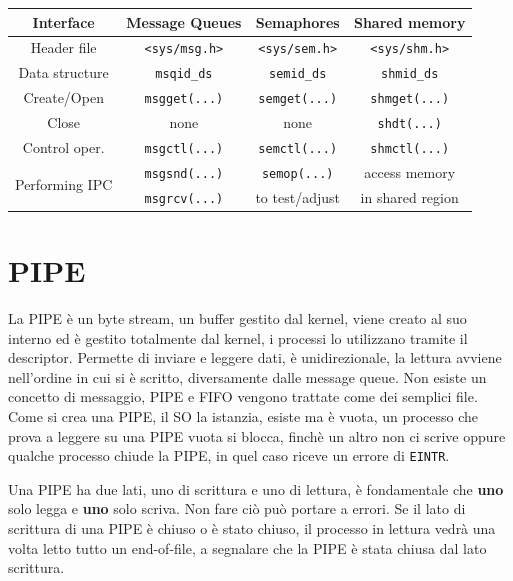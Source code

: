 \documentclass[a4paper, 12pt]{book}
\begin{document}
    \begin{center}
        \begin{tabular}{|c|c|c|c|}
            \hline 
            Interface & Message Queues & Semaphores & Shared memory \\
            \hline 
            Header file & \verb|<sys/msg.h>| & \verb|<sys/sem.h>| & \verb|<sys/shm.h>| \\
            Data structure & \verb|msqid_ds| & \verb|semid_ds| & \verb|shmid_ds| \\
            Create/Open & \verb|msgget(...)| & \verb|semget(...)| & \verb|shmget(...)| \\
            Close & none & none & \verb|shdt(...)| \\
            Control oper. & \verb|msgctl(...)| & \verb|semctl(...)| & \verb|shmctl(...)| \\
            \multirow{2}{4em}{Performing IPC} & \verb|msgsnd(...)| & \verb|semop(...)| & access memory \\
            & \verb|msgrcv(...)| & to test/adjust & in shared region \\
            \hline
        \end{tabular}    
    \end{center}

    \section{PIPE}

    La PIPE è un byte stream, un buffer gestito dal kernel,
    viene creato al suo interno ed è gestito totalmente 
    dal kernel, i processi lo utilizzano tramite il descriptor.
    Permette di inviare e leggere dati, è unidirezionale, 
    la lettura avviene nell'ordine in cui si è scritto, diversamente 
    dalle message queue. Non esiste un concetto di messaggio,
    PIPE e FIFO vengono trattate come dei semplici file.
    Come si crea una PIPE, il SO la istanzia, esiste ma è
    vuota, un processo che prova a leggere su una PIPE vuota 
    si blocca, finchè un altro non ci scrive oppure 
    qualche processo chiude la PIPE, in quel caso riceve 
    un errore di \verb|EINTR|. 
    
    Una PIPE ha due lati, uno di scrittura e uno di lettura, 
    è fondamentale che \textbf{uno} solo legga e 
    \textbf{uno} solo scriva. Non fare ciò può portare a 
    errori. Se il lato di scrittura di una PIPE è chiuso 
    o è stato chiuso, il processo in lettura vedrà una 
    volta letto tutto un end-of-file, a segnalare 
    che la PIPE è stata chiusa dal lato scrittura.
\end{document}
